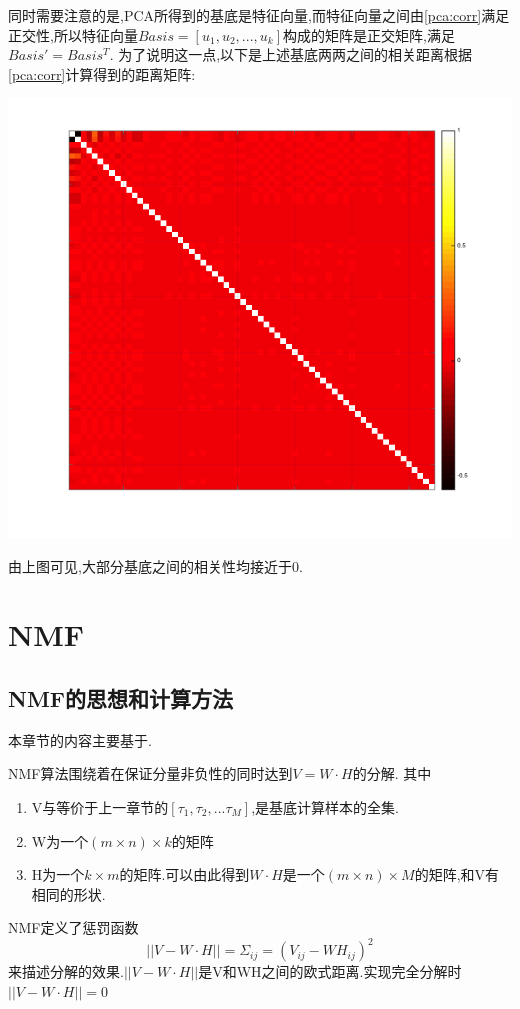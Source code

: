 同时需要注意的是,PCA所得到的基底是特征向量,而特征向量之间由\ref{pca:corr}满足正交性,所以特征向量$Basis = [u_1,u_2,...,u_k]$构成的矩阵是正交矩阵,满足$Basis' = Basis^T$. 为了说明这一点,以下是上述基底两两之间的相关距离根据\ref{pca:corr}计算得到的距离矩阵:
\begin{center}
\begin{minipage}[t]{\linewidth}
\center
{
\includegraphics[width=\MyFactor\textwidth]{Img/pca_correlation.png} 
}
\end{minipage}
\medskip
\end{center}
由上图可见,大部分基底之间的相关性均接近于0.

\section{NMF}

\subsection{NMF的思想和计算方法}
本章节的内容主要基于\cite{lee1999learning, lee2001algorithms}.\newline

NMF算法围绕着在保证分量非负性的同时达到$V=W \cdot H$的分解.
	其中
	\begin{enumerate}
		\item V与等价于上一章节的$[\tau_1, \tau_2,...\tau_M]$,是基底计算样本的全集.
		\item W为一个$(m \times n) \times k$的矩阵
		\item H为一个$k \times m$的矩阵.可以由此得到$W \cdot H$是一个$(m \times n) \times M$的矩阵,和V有相同的形状.
	\end{enumerate}
 NMF定义了惩罚函数\begin{equation}
 \label{nmf_cost} ||V-W\cdot H|| = \Sigma_{ij} = (V_{ij} - WH_{ij})^2\end{equation}来描述分解的效果.$||V-W\cdot H||$是V和WH之间的欧式距离.实现完全分解时$||V-W\cdot H||=0$

